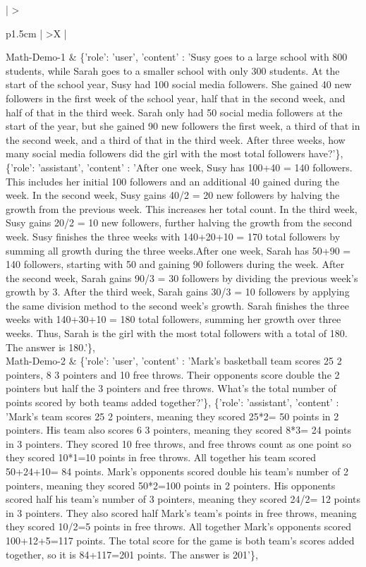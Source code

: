 \begin{xltabular}{\textwidth}{ 
    | >{\raggedright\arraybackslash}p{1.5cm} | %
    >{\RaggedRight\arraybackslash}X   |     %
}
\midrule
    Math-Demo-1 & \{'role': 'user', 'content' : 'Susy goes to a large school with 800 students, while Sarah goes to a smaller school with only 300 students.  At the start of the school year, Susy had 100 social media followers.  She gained 40 new followers in the first week of the school year, half that in the second week, and half of that in the third week.  Sarah only had 50 social media followers at the start of the year, but she gained 90 new followers the first week, a third of that in the second week, and a third of that in the third week.  After three weeks, how many social media followers did the girl with the most total followers have?'\},
    \{'role': 'assistant', 'content' : 'After one week, Susy has 100+40 = 140 followers. This includes her initial 100 followers and an additional 40 gained during the week. In the second week, Susy gains 40/2 = 20 new followers by halving the growth from the previous week. This increases her total count. In the third week, Susy gains 20/2 = 10 new followers, further halving the growth from the second week. Susy finishes the three weeks with 140+20+10 = 170 total followers by summing all growth during the three weeks.After one week, Sarah has 50+90 = 140 followers, starting with 50 and gaining 90 followers during the week. After the second week, Sarah gains 90/3 = 30 followers by dividing the previous week's growth by 3. After the third week, Sarah gains 30/3 = 10 followers by applying the same division method to the second week's growth. Sarah finishes the three weeks with 140+30+10 = 180 total followers, summing her growth over three weeks. Thus, Sarah is the girl with the most total followers with a total of 180. The answer is 180.'\},
     \\
\midrule
    Math-Demo-2 &  \{'role': 'user', 'content' : 'Mark's basketball team scores 25 2 pointers, 8 3 pointers and 10 free throws.  Their opponents score double the 2 pointers but half the 3 pointers and free throws.  What's the total number of points scored by both teams added together?'\},
    \{'role': 'assistant', 'content' : 'Mark's team scores 25 2 pointers, meaning they scored 25*2= 50 points in 2 pointers. His team also scores 6 3 pointers, meaning they scored 8*3= 24 points in 3 pointers. They scored 10 free throws, and free throws count as one point so they scored 10*1=10 points in free throws. All together his team scored 50+24+10= 84 points. Mark's opponents scored double his team's number of 2 pointers, meaning they scored 50*2=100 points in 2 pointers. His opponents scored half his team's number of 3 pointers, meaning they scored 24/2= 12 points in 3 pointers. They also scored half Mark's team's points in free throws, meaning they scored 10/2=5 points in free throws. All together Mark's opponents scored 100+12+5=117 points. The total score for the game is both team's scores added together, so it is 84+117=201 points. The answer is 201'\},

\end{xltabular}
